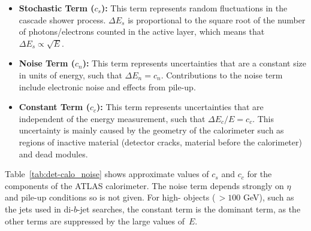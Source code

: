 \begin{itemize}[leftmargin=*]
\item\textbf{Stochastic Term ($c_s$):}
  This term represents random fluctuations in the cascade shower process.
  $\Delta E_s$ is proportional to the square root of the number of photons/electrons counted in the active layer,
  which means that $\Delta E_s \propto \sqrt{E}$. \vspace{0.5em}
\item\textbf{Noise Term ($c_n$):}
  This term represents uncertainties that are a constant size in units of energy, such that $\Delta E_n = c_n$.
  Contributions to the noise term include electronic noise and effects from pile-up. \vspace{0.5em} %
\item\textbf{Constant Term ($c_c$):}
  This term represents uncertainties that are independent of the energy measurement, such that $\Delta E_c/E = c_c$.
  This uncertainty is mainly caused by the geometry of the calorimeter such as regions of inactive material (detector cracks, material before the calorimeter) and dead modules.
\end{itemize}

Table~\ref{tab:det-calo_noise} shows approximate values of $c_s$ and $c_c$ for the components of the ATLAS calorimeter.
The noise term depends strongly on $\eta$ and pile-up conditions so is not given.
For high-\pT{} objects ($\,> 100$ GeV), such as the jets used in di-$b$-jet searches, the constant term is the dominant term,
as the other terms are suppressed by the large values of~$E$.

